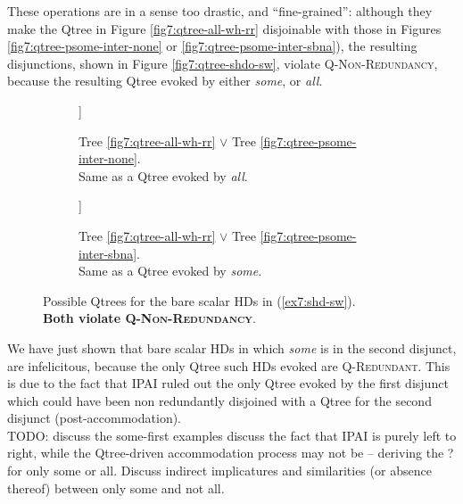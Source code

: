 These operations are in a sense too drastic, and ``fine-grained'': although they make the Qtree in Figure \ref{fig7:qtree-all-wh-rr} disjoinable with those in Figures \ref{fig7:qtree-psome-inter-none} or \ref{fig7:qtree-psome-inter-sbna}), the resulting disjunctions, shown in Figure \ref{fig7:qtree-shdo-sw}, violate \textsc{Q-Non-Redundancy}, because the resulting Qtree evoked by either \textit{some}, or \textit{all}.

\begin{figure}[H]
	\centering
	\hfill
	\begin{subfigure}[b]{.45\linewidth}
		\centering
		\begin{forest}
			[CS[$\neg\exists$][{$\exists\wedge\neg\forall$}][\fbox{$\forall$}]]
		\end{forest}
		\caption[]{Tree \ref{fig7:qtree-all-wh-rr} $\vee$ Tree \ref{fig7:qtree-psome-inter-none}.\\Same as a Qtree evoked by \textit{all}. }\label{fig7:qtree-shd-sw1}
	\end{subfigure}
	\hfill
	\begin{subfigure}[b]{.45\linewidth}
		\centering
		\begin{forest}
			[CS[$\neg\exists$][\fbox{$\exists\wedge\neg\forall$}][\fbox{$\forall$}]]
		\end{forest}
		\caption[]{Tree \ref{fig7:qtree-all-wh-rr} $\vee$ Tree \ref{fig7:qtree-psome-inter-sbna}.\\Same as a Qtree evoked by \textit{some}.}\label{fig7:qtree-shd-sw2}
	\end{subfigure}
	\caption[]{Possible Qtrees for the bare scalar HDs in (\ref{ex7:shd-sw}).\\\textbf{Both violate \textsc{Q-Non-Redundancy}}.}\label{fig7:qtree-shd-sw}
\end{figure}

We have just shown that bare scalar HDs in which \textit{some} is in the second disjunct, are infelicitous, because the only Qtree such HDs evoked are \textsc{Q-Redundant}. This is due to the fact that IPAI ruled out the only Qtree evoked by the first disjunct which could have been non redundantly disjoined with a Qtree for the second disjunct (post-accommodation). \\


TODO: discuss the some-first examples
discuss the fact that IPAI is purely left to right, while the Qtree-driven accommodation process may not be -- deriving the ? for only some or all.
Discuss indirect implicatures and similarities (or absence thereof) between only some and not all.



